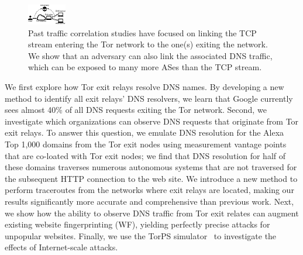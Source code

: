 \begin{figure}[t]
	\centering
	\includegraphics[width=0.65\linewidth]{figures/attack-concept.pdf}
	\caption{Past traffic correlation studies have focused on linking the TCP
		stream entering the Tor network to the one(s) exiting the network.  We
		show that an adversary can also link the associated DNS traffic, which
		can be exposed to many more ASes than the TCP stream.}
	\label{fig:overview}
\end{figure}

We first explore how Tor exit relays resolve DNS names.  By developing a
new method to identify all exit relays' DNS resolvers, we learn that Google
currently sees almost 40\% of all DNS requests exiting the Tor network.
Second, we investigate which organizations can observe
DNS requests that originate from Tor exit relays.  To answer this question, we emulate DNS
resolution for the Alexa Top 1,000 domains from the Tor exit nodes using
measurement vantage points that are co-loated with Tor exit nodes; we find that DNS
resolution for half of these domains traverses numerous autonomous
systems that are not traversed for the subsequent HTTP connection to the web
site.  
We introduce a new
method to perform traceroutes from the networks where
exit relays are located, making our results significantly more accurate and
comprehensive than previous work.
Next, we show how the ability to observe DNS traffic from Tor
exit relates can 
augment existing website fingerprinting (WF),
yielding perfectly precise \name attacks for unpopular websites.
Finally, we use the TorPS simulator~\cite{TorPS} to investigate the
effects of Internet-scale \name attacks. 


